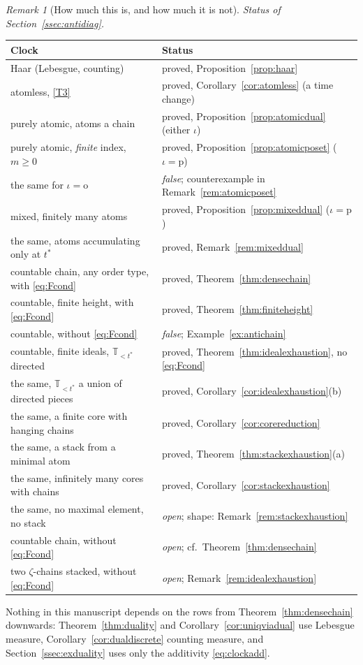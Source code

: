 \documentclass[11pt,a4paper]{article}
\theoremstyle{plain}
\theoremstyle{definition}
\theoremstyle{remark}
\newtheorem{remark}[theorem]{Remark}
\newcommand{\T}{\mathbb{T}}                     %
\begin{document}
\begin{remark}[How much this is, and how much it is not]
  \emph{Status of Section~\ref{ssec:antidiag}.}
  \begin{center}
  \begin{tabular}{@{}ll@{}}
  \toprule
  \textbf{Clock} & \textbf{Status} \\
  \midrule
  Haar (Lebesgue, counting) & proved, Proposition~\ref{prop:haar} \\
  atomless, \eqref{T3} & proved, Corollary~\ref{cor:atomless} (a time change) \\
  purely atomic, atoms a chain & proved, Proposition~\ref{prop:atomicdual} (either $\iota$) \\
  purely atomic, \emph{finite} index, $m \geq 0$ & proved, Proposition~\ref{prop:atomicposet} ($\iota = \mathrm{p}$) \\
  the same for $\iota = \mathrm{o}$ & \emph{false}; counterexample in Remark~\ref{rem:atomicposet} \\
  mixed, finitely many atoms & proved, Proposition~\ref{prop:mixeddual} ($\iota = \mathrm{p}$) \\
  the same, atoms accumulating only at $t^*$ & proved, Remark~\ref{rem:mixeddual} \\
  countable chain, any order type, with \eqref{eq:Fcond} & proved, Theorem~\ref{thm:densechain} \\
  countable, finite height, with \eqref{eq:Fcond} & proved, Theorem~\ref{thm:finiteheight} \\
  countable, without \eqref{eq:Fcond} & \emph{false}; Example~\ref{ex:antichain} \\
  countable, finite ideals, $\T_{<t^*}$ directed & proved, Theorem~\ref{thm:idealexhaustion}, no \eqref{eq:Fcond} \\
  the same, $\T_{<t^*}$ a union of directed pieces & proved, Corollary~\ref{cor:idealexhaustion}(b) \\
  the same, a finite core with hanging chains & proved, Corollary~\ref{cor:corereduction} \\
  the same, a stack from a minimal atom & proved, Theorem~\ref{thm:stackexhaustion}(a) \\
  the same, infinitely many cores with chains & proved, Corollary~\ref{cor:stackexhaustion} \\
  the same, no maximal element, no stack & \emph{open}; shape: Remark~\ref{rem:stackexhaustion} \\
  countable chain, without \eqref{eq:Fcond} & \emph{open}; cf.\ Theorem~\ref{thm:densechain} \\
  two $\zeta$-chains stacked, without \eqref{eq:Fcond} & \emph{open}; Remark~\ref{rem:idealexhaustion} \\
  \bottomrule
  \end{tabular}
  \end{center}
  Nothing in this manuscript depends on the rows from
  Theorem~\ref{thm:densechain} downwards:
  Theorem~\ref{thm:duality} and Corollary~\ref{cor:uniqviadual} use Lebesgue
  measure, Corollary~\ref{cor:dualdiscrete} counting measure, and
  Section~\ref{ssec:exduality} uses only the additivity \eqref{eq:clockadd}.
\end{remark}
\end{document}
